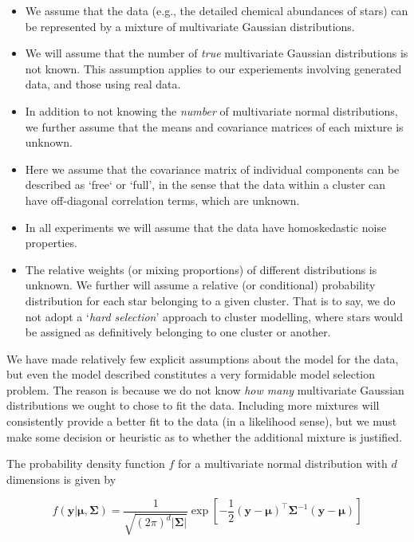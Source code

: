 \documentclass{aastex61}
\begin{document}
\begin{itemize}
\item We assume that the data (e.g., the detailed chemical abundances of stars)
      can be represented by a mixture of multivariate Gaussian distributions.
\item We will assume that the number of \emph{true} multivariate Gaussian
      distributions is not known. This assumption applies to our experiements
      involving generated data, and those using real data.
\item In addition to not knowing the \emph{number} of multivariate normal
      distributions, we further assume that the means and covariance matrices of
      each mixture is unknown.
\item Here we assume that the covariance matrix of individual components can be
      described as `free` or `full', in the sense that the data within a cluster
      can have off-diagonal correlation terms, which are unknown.
\item In all experiments we will assume that the data have homoskedastic noise
      properties.
\item The relative weights (or mixing proportions) of different distributions
      is unknown. We further will assume a relative (or conditional)
      probability distribution for each star belonging to a given cluster. That
      is to say, we do not adopt a `\emph{hard selection}' approach to cluster
      modelling, where stars would be assigned as definitively belonging to one
      cluster or another.
\end{itemize}

We have made relatively few explicit assumptions about the model for the data,
but even the model described constitutes a very formidable model selection 
problem. The reason is because we do not know \emph{how many} multivariate
Gaussian distributions we ought to chose to fit the data. Including more
mixtures will consistently provide a better fit to the data (in a likelihood
sense), but we must make some decision or heuristic as to whether the additional
mixture is justified.

The probability density function $f$ for a multivariate normal distribution with
$d$ dimensions is given by

\begin{equation}
    f(\bm{y}|\bm{\mu},\bm{\Sigma}) 
        = \frac{1}{\sqrt{(2\pi)^d|\bm{\Sigma}|}}
          \exp{\left[-\frac{1}{2}(\bm{y} - \bm{\mu})^\intercal\bm{\Sigma}^{-1}(\bm{y} - \bm{\mu})\right]}
\end{equation}
\end{document}

